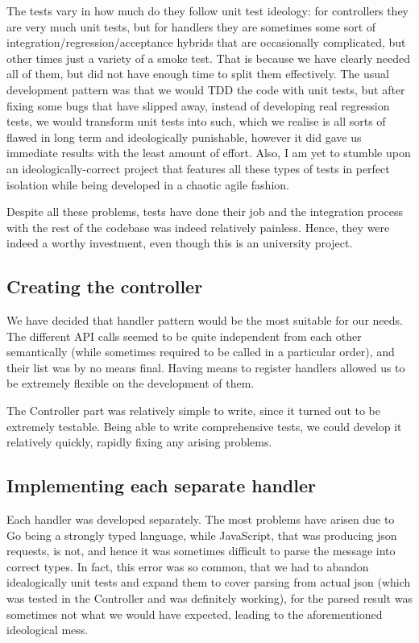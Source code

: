\documentclass{l3proj}
\begin{document}
The tests vary in how much do they follow unit test ideology: for controllers they are very much unit tests, but for handlers they are sometimes some sort of integration/regression/acceptance hybrids that are occasionally complicated, but other times just a variety of a smoke test. That is because we have clearly needed all of them, but did not have enough time to split them effectively. The usual development pattern was that we would TDD the code with unit tests, but after fixing some bugs that have slipped away, instead of developing real regression tests, we would transform unit tests into such, which we realise is all sorts of flawed in long term and ideologically punishable, however it did gave us immediate results with the least amount of effort. Also, I am yet to stumble upon an ideologically-correct project that features all these types of tests in perfect isolation while being developed in a chaotic agile fashion.

Despite all these problems, tests have done their job and the integration process with the rest of the codebase was indeed relatively painless. Hence, they were indeed a worthy investment, even though this is an university project.

\subsection{Creating the controller}

We have decided that handler pattern would be the most suitable for our needs. The different API calls seemed to be quite independent from each other semantically (while sometimes required to be called in a particular order), and their list was by no means final. Having means to register handlers allowed us to be extremely flexible on the development of them.

The Controller part was relatively simple to write, since it turned out to be extremely testable. Being able to write comprehensive tests, we could develop it relatively quickly, rapidly fixing any arising problems. 

\subsection{Implementing each separate handler}

Each handler was developed separately. The most problems have arisen due to Go being a strongly typed language, while JavaScript, that was producing json requests, is not, and hence it was sometimes difficult to parse the message into correct types. In fact, this error was so common, that we had to abandon idealogically unit tests and expand them to cover parsing from actual json (which was tested in the Controller and was definitely working), for the parsed result was sometimes not what we would have expected, leading to the aforementioned ideological mess.
\end{document}
